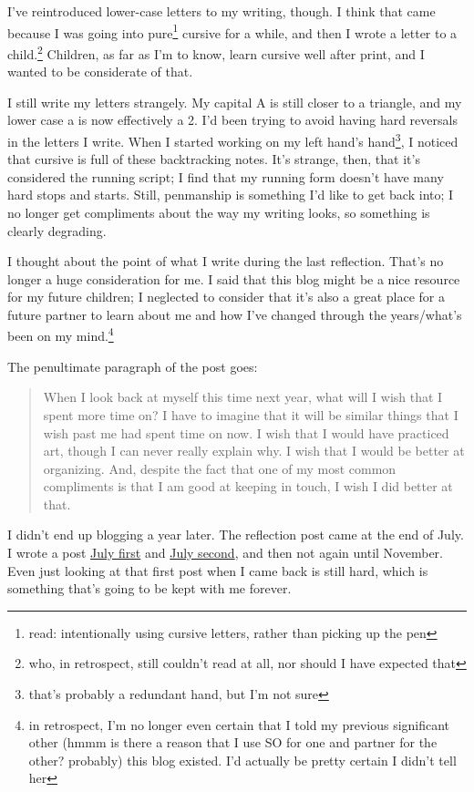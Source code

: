 \documentclass[12pt]{article}
\renewcommand{\,}{\textsuperscript{,}}
\begin{document}
I've reintroduced lower-case letters to my writing, though.  
I think that came because I was going into pure\footnote{read: intentionally using cursive letters, rather than picking up the pen} cursive for a while, and then I wrote a letter to a child.\footnote{who, in retrospect, still couldn't read at all, nor should I have expected that}  
Children, as far as I'm to know, learn cursive well after print, and I wanted to be considerate of that.

I still write my letters strangely.  
My capital A is still closer to a triangle, and my lower case a is now effectively a 2.  
I'd been trying to avoid having hard reversals in the letters I write.  
When I started working on my left hand's hand\footnote{that's probably a redundant hand, but I'm not sure}, I noticed that cursive is full of these backtracking notes.  
It's strange, then, that it's considered the running script; I find that my running form doesn't have many hard stops and starts.  
Still, penmanship is something I'd like to get back into; I no longer get compliments about the way my writing looks, so something is clearly degrading.

I thought about the point of what I write during the last reflection.  
That's no longer a huge consideration for me.  
I said that this blog might be a nice resource for my future children; I neglected to consider that it's also a great place for a future partner to learn about me and how I've changed through the years/what's been on my mind.\footnote{in retrospect, I'm no longer even certain that I told my previous significant other (hmmm is there a reason that I use SO for one and partner for the other? probably) this blog existed. I'd actually be pretty certain I didn't tell her}

The penultimate paragraph of the post goes: \begin{quote}

When I look back at myself this time next year, what will I wish that I
spent more time on? I have to imagine that it will be similar things
that I wish past me had spent time on now. I wish that I would have
practiced art, though I can never really explain why. I wish that I
would be better at organizing. And, despite the fact that one of my most
common compliments is that I am good at keeping in touch, I wish I did better at that.  
\end{quote}

I didn't end up blogging a year later.  
The reflection post came at the end of July.  
I wrote a post \href{reflection-2024a}{July first} and \href{writers-slump}{July second}, and then not again until November.  
Even just looking at that first post when I came back is still hard, which is something that's going to be kept with me forever.
\end{document}
